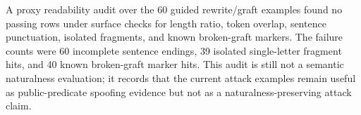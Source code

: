 A proxy readability audit over the 60 guided rewrite/graft examples found no
passing rows under surface checks for length ratio, token overlap, sentence
punctuation, isolated fragments, and known broken-graft markers.  The failure
counts were 60 incomplete sentence endings, 39 isolated single-letter fragment
hits, and 40 known broken-graft marker hits.  This audit is still not a
semantic naturalness evaluation; it records that the current attack examples
remain useful as public-predicate spoofing evidence but not as a
naturalness-preserving attack claim.
